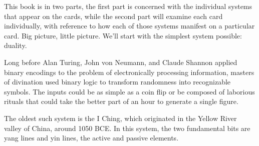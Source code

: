 \documentclass[openright]{book}
\begin{document}
\begin{center}
\end{center}

\newpage

\noindent This book is in two parts, the first part is concerned with the individual systems that appear on the cards, while the second part will examine each card individually, with reference to how each of those systems manifest on a particular card. Big picture, little picture. We'll start with the simplest system possible: duality.

Long before Alan Turing, John von Neumann, and Claude Shannon applied binary encodings to the problem of electronically processing information, masters of divination used binary logic to transform randomness into recognizable symbols. The inputs could be as simple as a coin flip or be composed of laborious rituals that could take the better part of an hour to generate a single figure.

The oldest such system is the I Ching, which originated in the Yellow River valley of China, around 1050 BCE. In this system, the two fundamental bits are yang lines and yin lines, the active and passive elements.
\end{document}
